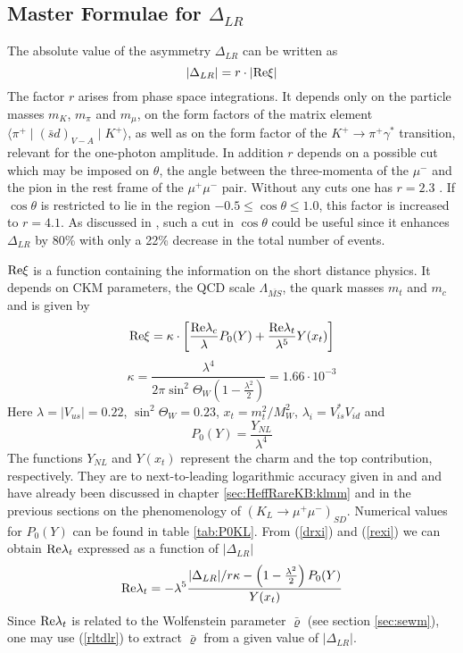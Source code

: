 \subsection{Master Formulae for $\Delta_{LR}$}
\label{sec:KLmm:MasterDeLR}
The absolute value of the asymmetry $\Delta_{LR}$ can be written as
\begin{equation}\label{drxi}
|\Delta_{LR}|=r\cdot |{{\rm Re}}\xi|
\end{equation}
The factor $r$ arises from phase space integrations. It depends only on
the particle masses $m_K$, $m_\pi$ and $m_\mu$, on the form factors of
the matrix element $\langle\pi^+\mid(\bar sd)_{V-A}\mid K^+\rangle$, as
well as on the form factor of the $K^+\to\pi^+\gamma^\ast$ transition,
relevant for the one-photon amplitude. In addition $r$ depends on a
possible cut which may be imposed on $\theta$, the angle between the
three-momenta of the $\mu^-$ and the pion in the rest frame of the
$\mu^+\mu^-$ pair.  Without any cuts one has $r=2.3$ \cite{luetal:92}. If
$\cos\theta$ is restricted to lie in the region $-0.5\leq\cos\theta\leq
1.0 $, this factor is increased to $r=4.1$.  As discussed in
\cite{luetal:92}, such a cut in $\cos\theta$ could be useful since it
enhances $\Delta_{LR}$ by 80\% with only a 22\% decrease in the total
number of events.

${{\rm Re}}\xi$ is a function containing the information on the
short distance physics. It depends on CKM parameters, the QCD scale
$\Lambda_{\overline{MS}}$, the quark masses $m_t$ and $m_c$ and is given by
\begin{equation}
\label{rexi}
{{\rm Re}}\xi=
\kappa\cdot\left[\frac{{\rm Re} \lambda_c}{\lambda}P_0(Y)+\frac{{\rm Re} \lambda_t}{\lambda^5}Y(x_t)
\right]            
\end{equation}
\begin{equation}\label{kap}
\kappa=\frac{\lambda^4}{2\pi\sin^2\Theta_W(1-\frac{\lambda^2}{2})}
 =1.66\cdot 10^{-3}   
\end{equation}
Here $\lambda=|V_{us}|=0.22$, $\sin^2\Theta_W=0.23$,
$x_t=m^2_t/M^2_W$, $\lambda_i=V^\ast_{is}V_{id}$ and
\begin{equation}\label{p0ynl}
P_0(Y)=\frac{Y_{NL}}{\lambda^4}
\end{equation}
The functions $Y_{NL}$ and $Y(x_t)$ represent the charm and the top
contribution, respectively. They are to next-to-leading logarithmic
accuracy given in  and  and have already been
discussed in chapter \ref{sec:HeffRareKB:klmm} and in the previous
sections on the phenomenology of $(K_L\to\mu^+\mu^-)_{SD}$. Numerical
values for $P_0(Y)$ can be found in table \ref{tab:P0KL}.
From (\ref{drxi}) and (\ref{rexi}) we can obtain ${\rm Re} \lambda_t$ expressed as a
function of $|\Delta_{LR}|$
\begin{equation}\label{rltdlr}
{\rm Re} \lambda_t=-\lambda^5\frac{{|\Delta_{LR}|}/{r \kappa}-
  \left(1-\frac{\lambda^2}{2}\right) P_0(Y)}{Y(x_t)}  
\end{equation}
Since ${\rm Re} \lambda_t$ is related to the Wolfenstein parameter $\bar\varrho$
(see section \ref{sec:sewm}), one may use (\ref{rltdlr}) to extract
$\bar\varrho$ from a given value of $|\Delta_{LR}|$.

